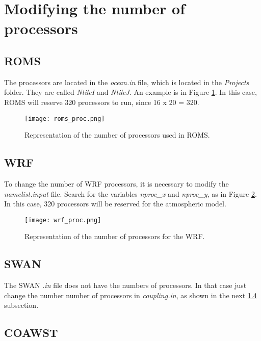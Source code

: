 \section{Modifying the number of processors}
\bigskip

\subsection{ROMS}
\bigskip

 The processors are located in the \textit{ocean.in} file, which is located in the \textit{Projects} folder. They
are called \textit{NtileI} and \textit{NtileJ}. An example is in Figure \textcolor{bleu_cite}{\ref{romsproc}}.
In this case, ROMS will reserve 320 processors to run, since 16 x 20 = 320.

\bigskip

\begin{figure}[H]
    \centering
    \texttt{[image: roms\_proc.png]}
    \caption{Representation of the number of processors used in ROMS.}
    \label{romsproc}
\end{figure}
\bigskip

\subsection{WRF}
\bigskip

 To change the number of WRF processors, it is necessary to modify the \textit{namelist.input} file.
Search for the variables \textit{nproc\_x} and \textit{nproc\_y}, as in Figure \textcolor{bleu_cite}{\ref{procswrf}}.
In this case, 320 processors will be reserved for the atmospheric model.

\begin{figure}[H]
    \centering
    \texttt{[image: wrf\_proc.png]}
    \caption{Representation of the number of processors for the WRF.}
    \label{procswrf}
\end{figure}
\bigskip

\subsection{SWAN}

\bigskip The SWAN \textit{.in} file does not have the numbers of processors. In that case just change the number
number of processors in \textit{coupling.in}, as shown in the next \textcolor{bleu_cite}{\ref{coawstproc}} subsection.
\bigskip

\subsection{COAWST}\label{coawstproc}
\bigskip

